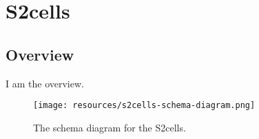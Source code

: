 
\section{S2cells}
\label{sec:s2cells}
\subsection{Overview}
\label{ssec:overview}

I am the overview.

\begin{figure}[h!]
  \begin{center}
    \texttt{[image: resources/s2cells-schema-diagram.png]}
  \end{center}
  \caption{The schema diagram for the S2cells.}
  \label{fig:ov-diagram}
\end{figure}


